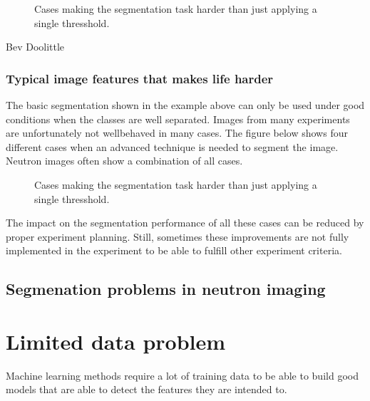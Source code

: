 \documentclass[letterpaper,10pt,english]{sphinxmanual}
\begin{document}
\begin{figure}[htbp]
\centering
\capstart

\noindent{}
\caption{Cases making the segmentation task harder than just applying a single thresshold.}\label{\detokenize{ML4NeutronImageSegmentation:id9}}\end{figure}



 Bev Doolittle


\subsection{Typical image features that makes life harder}
\label{\detokenize{ML4NeutronImageSegmentation:typical-image-features-that-makes-life-harder}}
The basic segmentation shown in the example above can only be used under good conditions when the classes are well separated. Images from many experiments are unfortunately not well\sphinxhyphen{}behaved in many cases. The figure below shows four different cases when an advanced technique is needed to segment the image. Neutron images often show a combination of all cases.

\begin{figure}[htbp]
\centering
\capstart

\noindent{}
\caption{Cases making the segmentation task harder than just applying a single thresshold.}\label{\detokenize{ML4NeutronImageSegmentation:id10}}\end{figure}

The impact on the segmentation performance of all these cases can be reduced by proper experiment planning. Still, sometimes these improvements are not fully implemented in the experiment to be able to fulfill other experiment criteria.




\section{Segmenation problems in neutron imaging}
\label{\detokenize{ML4NeutronImageSegmentation:segmenation-problems-in-neutron-imaging}}

\chapter{Limited data problem}
\label{\detokenize{ML4NeutronImageSegmentation:limited-data-problem}}
Machine learning methods require a lot of training data to be able to build good models that are able to detect the features they are intended to.
\end{document}

